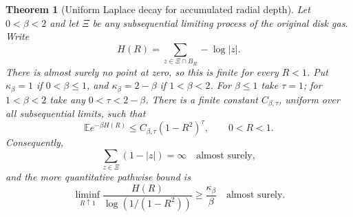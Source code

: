 \documentclass[11pt,a4paper]{article}
\numberwithin{equation}{section}
\newtheorem{theorem}{Theorem}[section]
\theoremstyle{definition}
\theoremstyle{remark}
\newcommand{\E}{\mathbb E}
\begin{document}
\begin{theorem}[Uniform Laplace decay for accumulated radial depth]
\label{thm:non-blaschke-limits}
Let $0<\beta<2$ and let $\Xi$ be any subsequential limiting
process of the original disk gas. Write
\[
 H(R)=\sum_{z\in\Xi\cap B_R}-\log|z|.
\]
There is almost surely no point at zero, so this is finite for every
$R<1$. Put $\kappa_\beta=1$ if $0<\beta\le1$, and
$\kappa_\beta=2-\beta$ if $1<\beta<2$. For $\beta\le1$ take
$\tau=1$; for $1<\beta<2$ take any $0<\tau<2-\beta$.
There is a finite constant $C_{\beta,\tau}$, uniform over all
subsequential limits, such that
\begin{equation}
 \E e^{-\beta H(R)}
 \le C_{\beta,\tau}(1-R^2)^\tau,
 \qquad 0<R<1.
 \label{eq:non-blaschke-depth-laplace}
\end{equation}
Consequently,
\begin{equation}
 \sum_{z\in\Xi}(1-|z|)=\infty
 \quad\text{almost surely},
 \label{eq:non-blaschke-divergence}
\end{equation}
and the more quantitative pathwise bound is
\begin{equation}
 \liminf_{R\uparrow1}
 \frac{H(R)}{\log(1/(1-R^2))}
 \ge\frac{\kappa_\beta}{\beta}
 \quad\text{almost surely}.
 \label{eq:non-blaschke-depth-growth}
\end{equation}
\end{theorem}
\end{document}
